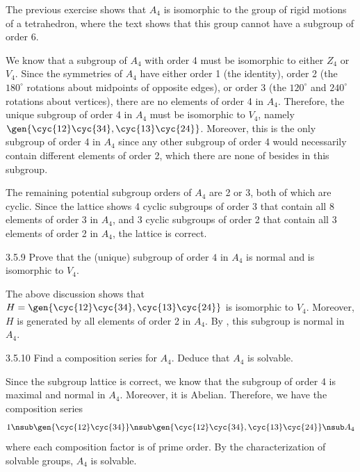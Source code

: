 \begin{sol}
    The previous exercise shows that $A_4$ is isomorphic to the group of rigid motions of a tetrahedron, where the text shows that this group cannot have a subgroup of order 6.

    We know that a subgroup of $A_4$ with order 4 must be isomorphic to either $Z_4$ or $V_4$.
	Since the symmetries of $A_4$ have either order 1 (the identity), order 2 (the $180^\circ$ rotations about midpoints of opposite edges), or order 3 (the $120^\circ$ and $240^\circ$ rotations about vertices), there are no elements of order 4 in $A_4$.
	Therefore, the unique subgroup of order 4 in $A_4$ must be isomorphic to $V_4$, namely $\gen{\cyc{1 2}\cyc{3 4}, \cyc{1 3}\cyc{2 4}}$.
	Moreover, this is the only subgroup of order 4 in $A_4$ since any other subgroup of order 4 would necessarily contain different elements of order 2, which there are none of besides in this subgroup.

    The remaining potential subgroup orders of $A_4$ are 2 or 3, both of which are cyclic.
	Since the lattice shows 4 cyclic subgroups of order 3 that contain all 8 elements of order 3 in $A_4$, and 3 cyclic subgroups of order 2 that contain all 3 elements of order 2 in $A_4$, the lattice is correct.
\end{sol}

\begin{exercise}{3.5.9}
    Prove that the (unique) subgroup of order $4$ in $A_4$ is normal and is isomorphic to $V_4$.
\end{exercise}

\begin{sol}
    The above discussion shows that $H = \gen{\cyc{1 2}\cyc{3 4}, \cyc{1 3}\cyc{2 4}}$ is isomorphic to $V_4$.
	Moreover, $H$ is generated by all elements of order 2 in $A_4$.
	By , this subgroup is normal in $A_4$.
\end{sol}

\begin{exercise}{3.5.10}
    Find a composition series for $A_4$.
	Deduce that $A_4$ is solvable.
\end{exercise}

\begin{sol}
    Since the subgroup lattice is correct, we know that the subgroup of order 4 is maximal and normal in $A_4$.
	Moreover, it is Abelian.
	Therefore, we have the composition series
    \[
    	1 \nsub \gen{\cyc{1 2}\cyc{3 4}} \nsub \gen{\cyc{1 2}\cyc{3 4}, \cyc{1 3}\cyc{2 4}} \nsub A_4
    \]
    where each composition factor is of prime order.
	By the characterization of solvable groups, $A_4$ is solvable.
\end{sol}

